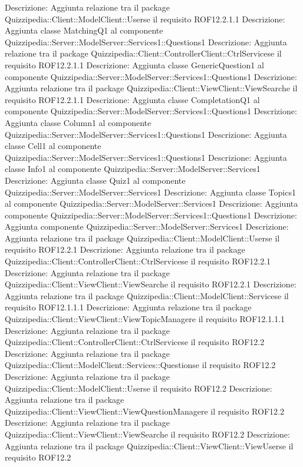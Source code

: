 Descrizione: Aggiunta relazione tra il package Quizzipedia::Client::ModelClient::Userse il requisito ROF12.2.1.1 
Descrizione: Aggiunta classe MatchingQ1 al componente Quizzipedia::Server::ModelServer::Services1::Questions1 
Descrizione: Aggiunta relazione tra il package Quizzipedia::Client::ControllerClient::CtrlServicese il requisito ROF12.2.1.1 
Descrizione: Aggiunta classe GenericQuestion1 al componente Quizzipedia::Server::ModelServer::Services1::Questions1 
Descrizione: Aggiunta relazione tra il package Quizzipedia::Client::ViewClient::ViewSearche il requisito ROF12.2.1.1 
Descrizione: Aggiunta classe CompletationQ1 al componente Quizzipedia::Server::ModelServer::Services1::Questions1 
Descrizione: Aggiunta classe Column1 al componente Quizzipedia::Server::ModelServer::Services1::Questions1 
Descrizione: Aggiunta classe Cell1 al componente Quizzipedia::Server::ModelServer::Services1::Questions1 
Descrizione: Aggiunta classe Info1 al componente Quizzipedia::Server::ModelServer::Services1 
Descrizione: Aggiunta classe Quiz1 al componente Quizzipedia::Server::ModelServer::Services1 
Descrizione: Aggiunta classe Topics1 al componente Quizzipedia::Server::ModelServer::Services1 
Descrizione: Aggiunta componente Quizzipedia::Server::ModelServer::Services1::Questions1 
Descrizione: Aggiunta componente Quizzipedia::Server::ModelServer::Services1 
Descrizione: Aggiunta relazione tra il package Quizzipedia::Client::ModelClient::Userse il requisito ROF12.2.1 
Descrizione: Aggiunta relazione tra il package Quizzipedia::Client::ControllerClient::CtrlServicese il requisito ROF12.2.1 
Descrizione: Aggiunta relazione tra il package Quizzipedia::Client::ViewClient::ViewSearche il requisito ROF12.2.1 
Descrizione: Aggiunta relazione tra il package Quizzipedia::Client::ModelClient::Servicese il requisito ROF12.1.1.1 
Descrizione: Aggiunta relazione tra il package Quizzipedia::Client::ViewClient::ViewTopicManagere il requisito ROF12.1.1.1 
Descrizione: Aggiunta relazione tra il package Quizzipedia::Client::ControllerClient::CtrlServicese il requisito ROF12.2 
Descrizione: Aggiunta relazione tra il package Quizzipedia::Client::ModelClient::Services::Questionse il requisito ROF12.2 
Descrizione: Aggiunta relazione tra il package Quizzipedia::Client::ModelClient::Userse il requisito ROF12.2 
Descrizione: Aggiunta relazione tra il package Quizzipedia::Client::ViewClient::ViewQuestionManagere il requisito ROF12.2 
Descrizione: Aggiunta relazione tra il package Quizzipedia::Client::ViewClient::ViewSearche il requisito ROF12.2 
Descrizione: Aggiunta relazione tra il package Quizzipedia::Client::ViewClient::ViewUserse il requisito ROF12.2 
